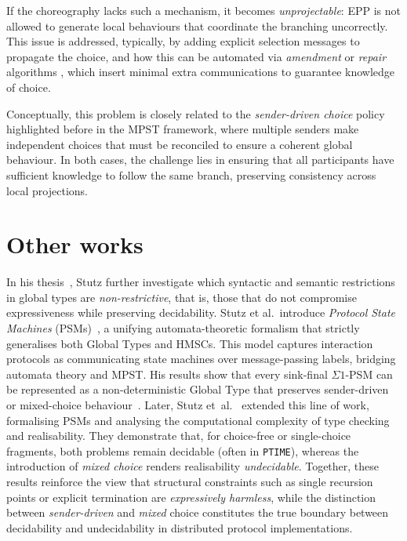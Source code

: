 If the choreography lacks such a mechanism, it becomes 
\emph{unprojectable}: EPP is not allowed to generate local behaviours 
that coordinate the branching uncorrectly. This issue 
is addressed, typically, by adding explicit selection messages to 
propagate the choice, and how this can be automated via 
\emph{amendment} or \emph{repair} algorithms 
\cite{DBLP:journals/corr/LaneseMZ13, basu2016automated}, 
which insert minimal extra 
communications to guarantee knowledge of choice.  

Conceptually, this problem is closely related to the \emph{sender-driven 
choice} policy highlighted before in the MPST framework, where 
multiple senders make independent choices that must be reconciled to 
ensure a coherent global behaviour. In both cases, the challenge lies 
in ensuring that all participants have sufficient knowledge to follow 
the same branch, preserving consistency across local projections. 


\section{Other works}
In his thesis~\cite{stutz2024implementability}, 
Stutz further investigate which syntactic and semantic
restrictions in global types are \emph{non-restrictive}, that is, those that
do not compromise expressiveness while preserving decidability.  
Stutz et al.~introduce
\emph{Protocol State Machines} (PSMs)~\cite{stutz2025automata}, 
a unifying automata-theoretic
formalism that strictly generalises both Global Types and HMSCs.  
This model captures interaction protocols as communicating state
machines over message-passing labels, bridging automata theory and MPST.
His results show that every sink-final $\Sigma 1$-PSM can be represented
as a non-deterministic Global Type that preserves sender-driven or
mixed-choice behaviour~\cite[Thm.~8.14]{stutz2024implementability}.  
Later, Stutz et~al.~\cite{stutz2025automata} extended this line of work,
formalising PSMs and analysing the computational complexity of type
checking and realisability. They demonstrate that, for choice-free or
single-choice fragments, both problems remain decidable (often in
\verb|PTIME|), whereas the introduction of \emph{mixed choice} renders
realisability \emph{undecidable}.  
Together, these results reinforce the view that structural constraints
such as single recursion points or explicit termination are
\emph{expressively harmless}, while the distinction between
\emph{sender-driven} and \emph{mixed} choice constitutes the true
boundary between decidability and undecidability in distributed protocol
implementations.

